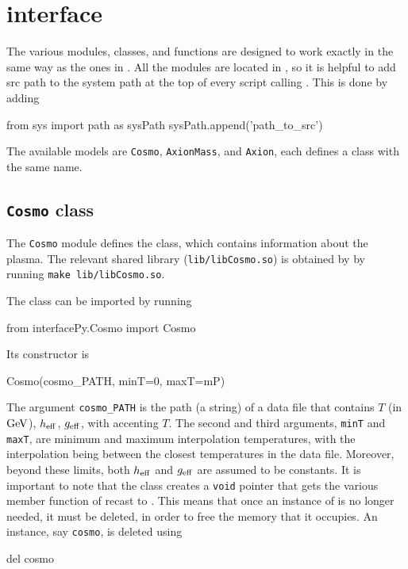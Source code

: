 \documentclass[11pt,a4paper]{article}
\begin{document}
\section{\PY interface}\label{app:modules}
\setcounter{equation}{0}

The various \PY modules, classes, and functions are designed to work exactly in the same way as the ones in \CPP. All the modules are located in , so it is helpful to add {\pyin src} path to the system path at the top of every script calling \mimes. This is done by adding
%
\begin{py}
	from sys import path as sysPath
	sysPath.append('path_to_src')
\end{py}

The available models are {\tt Cosmo}, {\tt AxionMass}, and {\tt Axion}, each defines a class with the same name.

\subsection{{\tt Cosmo} class}
%
The {\tt Cosmo} module defines the  class, which contains information about the plasma. The relevant shared library ({\tt lib/libCosmo.so}) is obtained by by running {\tt make lib/libCosmo.so}.
%

The class can be imported by running 
%
\begin{py}
	from interfacePy.Cosmo import Cosmo
\end{py}
%
Its constructor is
%
\begin{py}
	Cosmo(cosmo_PATH, minT=0, maxT=mP)
\end{py}
%
The argument {\tt cosmo\_PATH} is the path (a string) of a data file that contains $T$ (in ${\rm GeV}$), $h_{\rm eff}{}$, $g_{\rm eff}{}$, with accenting $T$. The second and third arguments, {\tt minT} and {\tt maxT}, are minimum and maximum interpolation temperatures, with the interpolation being between the closest temperatures in the data file. Moreover, beyond these limits, both $h_{\rm eff}{}$ and $g_{\rm eff}{}$ are assumed to be constants. It is important to note that the class creates a {\tt void} pointer that gets the various member function of  recast to . This means that once an instance of  is no longer needed, it must be deleted, in order to free the memory that it occupies. An instance, say {\tt cosmo}, is deleted using
%
\begin{py}
	del cosmo
\end{py}
\end{document}
